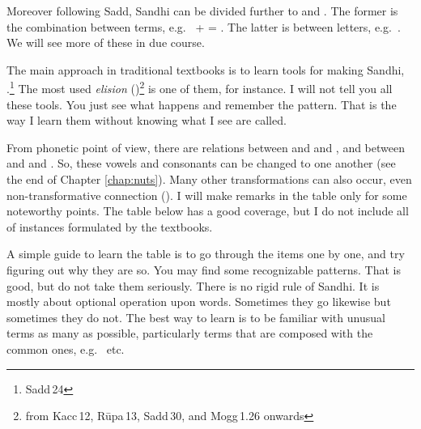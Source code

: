Moreover following Sadd, Sandhi can be divided further to  and . The former is the combination between terms, e.g.\  +  = . The latter is between letters, e.g.\ . We will see more of these in due course.

The main approach in traditional textbooks is to learn tools for making Sandhi, .\footnote{Sadd\,24} The most used \emph{elision} ()\footnote{from Kacc\,12, R\=upa\,13, Sadd\,30, and Mogg\,1.26 onwards} is one of them, for instance. I will not tell you all these tools. You just see what happens and remember the pattern. That is the way I learn them without knowing what I see are called.

From phonetic point of view, there are relations between  and  and , and between  and  and . So, these vowels and consonants can be changed to one another (see the end of Chapter \ref{chap:nuts}). Many other transformations can also occur, even non-transformative connection (). I will make remarks in the table only for some noteworthy points. The table below has a good coverage, but I do not include all of instances formulated by the textbooks.

A simple guide to learn the table is to go through the items one by one, and try figuring out why they are so. You may find some recognizable patterns. That is good, but do not take them seriously. There is no rigid rule of Sandhi. It is mostly about optional operation upon words. Sometimes they go likewise but sometimes they do not. The best way to learn is to be familiar with unusual terms as many as possible, particularly terms that are composed with the common ones, e.g.\  etc.

